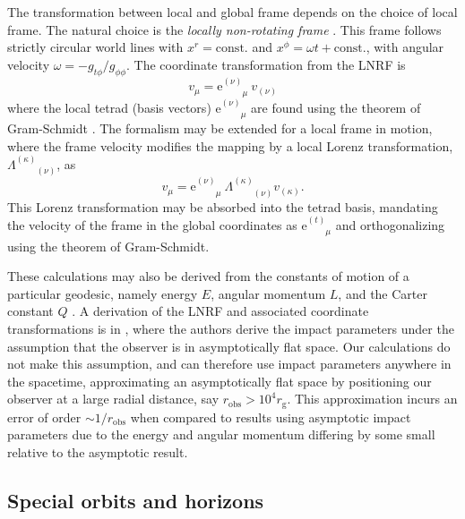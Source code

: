 \documentclass[fleqn,usenatbib]{mnras}
\newcommand{\e}{\text{e}}
\newcommand{\rg}{r_\text{g}}
\newcommand{\utensor}[3]{#1^{#2}_{\phantom{#2}#3}}
\begin{document}
The transformation between local and global frame depends on the choice of local
frame. The natural choice is the \emph{locally non-rotating frame}
\citep[LNRF;][]{bardeen_rotating_1972}. This frame follows strictly
circular world lines with $x^r = \text{const.}$ and $x^\phi = \omega t +
\text{const.}$, with angular velocity $\omega = -g_{t\phi} / g_{\phi\phi}$. The
coordinate transformation from the LNRF is
\begin{equation}
    \label{eq:local-to-global-velocity}
    v_\mu = \e^{(\nu)}_{\phantom{(\nu)}\mu}\  v_{(\nu)}
\end{equation}
where the local tetrad (basis vectors) $\e^{(\nu)}_{\phantom{(\nu)}\mu}$ are
found using the theorem of Gram-Schmidt \citep[][Appendix
\ref{appendix:gram-schmidt}]{schmidt_uber_1989}. The formalism may be extended
for a local frame in motion, where the frame velocity modifies the mapping by a
local Lorenz transformation, $\Lambda^{(\kappa)}_{\phantom{(\kappa)}(\nu)}$, as
\begin{equation}
    v_\mu = \e^{(\nu)}_{\phantom{(\nu)}\mu}\  \Lambda^{(\kappa)}_{\phantom{(a)}(\nu)} v_{(\kappa)}.
\end{equation}
This Lorenz transformation may be absorbed into the tetrad basis, mandating the
velocity of the frame in the global coordinates as $\utensor{\e}{(t)}{\mu}$ and
orthogonalizing using the theorem of Gram-Schmidt.

These calculations may also be derived from the constants of motion of a
particular geodesic, namely energy $E$, angular momentum $L$, and the Carter
constant $Q$ \citep{carter_global_1968}. A
derivation of the LNRF and associated coordinate transformations is in
\citet{cunningham_optical_1973}, where the authors derive the impact parameters under
the assumption that the observer is in asymptotically flat space. Our
calculations do not make this assumption, and can therefore use impact
parameters anywhere in the spacetime, approximating an asymptotically flat
space by positioning our observer at a large radial distance, say $r_\text{obs}
> 10^4 \rg$. This approximation incurs an error of order $\sim1/r_\text{obs}$
when compared to results using asymptotic impact parameters due to the energy and
angular momentum differing by some small relative to the asymptotic result.

\subsection{Special orbits and horizons}
\label{sec:special-orbits}
\end{document}
